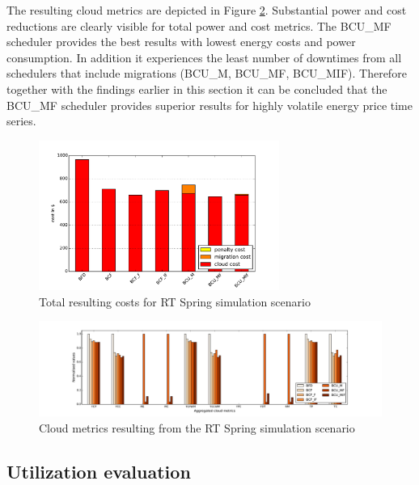 The resulting cloud metrics are depicted in Figure \ref{fig:RT_Spring_cloud_metrics}. Substantial power and cost reductions are clearly visible for total power and cost metrics. The BCU\_MF scheduler provides the best results with lowest energy costs and power consumption. In addition it experiences the least number of downtimes from all schedulers that include migrations (BCU\_M, BCU\_MF, BCU\_MIF). Therefore together with the findings earlier in this section it can be concluded that the BCU\_MF scheduler provides superior results for highly volatile energy price time series. 

\begin{figure}[htbp]
	\centering
		\includegraphics[width=0.7\textwidth]{figures/evaluation_and_results/RT_Spring_total_cost.pdf}
	\caption{Total resulting costs for RT Spring simulation scenario}
	\label{fig:RT_Spring_total_cost}
\end{figure}

\begin{figure}[htbp]
	\centering
	\hspace*{-1.2in}
		\includegraphics[width=1.50\textwidth]{figures/evaluation_and_results/RT_Spring_cloud_metrics.pdf}
	\caption{Cloud metrics resulting from the RT Spring simulation scenario}
	\label{fig:RT_Spring_cloud_metrics}
\end{figure}





\subsection{Utilization evaluation}

